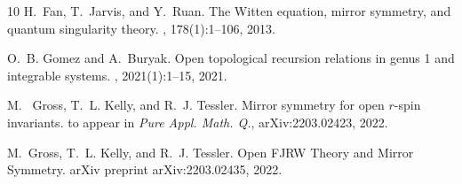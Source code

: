 \documentclass[11pt]{amsart}
\theoremstyle{definition}
\theoremstyle{remark}
\newcommand{\<}{\left<}
\renewcommand{\>}{\right>}
\numberwithin{equation}{section}
\begin{document}
\begin{thebibliography}{10}
H.~Fan, T.~Jarvis, and %
Y.~Ruan.
\newblock The {W}itten equation, mirror symmetry, and quantum singularity
  theory.
, 178(1):1--106, 2013.

O.~B. Gomez and A.~Buryak.
\newblock Open topological recursion relations in genus 1 and integrable
  systems.
, 2021(1):1--15, 2021.

M.%
~Gross, T.~L. Kelly, and R.~J. Tessler.
\newblock Mirror symmetry for open $r$-spin invariants.
\newblock to appear in \textit{Pure Appl. Math. Q.}, arXiv:2203.02423, 2022.

M.~Gross, T.~L. Kelly, and R.~J. Tessler.
\newblock Open {FJRW} {T}heory and {M}irror {S}ymmetry.
\newblock arXiv preprint arXiv:2203.02435, 2022.


\end{thebibliography}
\end{document}

